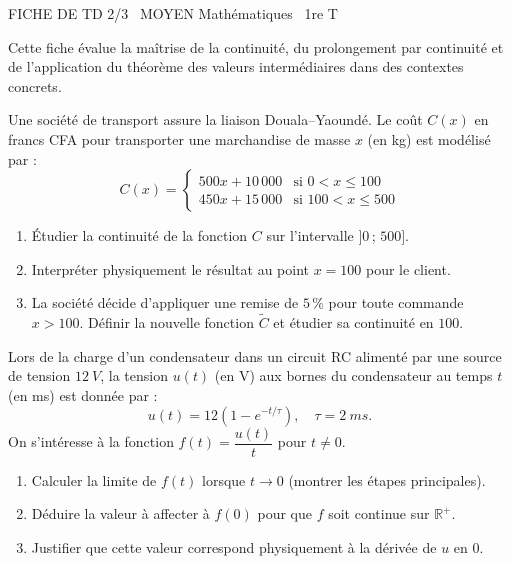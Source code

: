 \documentclass[11pt]{article}
\begin{document}
\begin{tcolorbox}[enhanced,colback=popink,colframe=popink,arc=10pt,boxrule=0pt,left=12pt,right=12pt,top=9pt,bottom=9pt]
{\color{white}\popxbold\small FICHE DE TD 2/3 \textbullet\ MOYEN \hfill Mathématiques \textbullet\ 1re T\par}
\end{tcolorbox}
\vspace{4pt}
Cette fiche évalue la maîtrise de la continuité, du prolongement par continuité et de l'application du théorème des valeurs intermédiaires dans des contextes concrets.

\begin{exercice}
Une société de transport assure la liaison Douala--Yaoundé. Le coût $C(x)$ en francs CFA pour transporter une marchandise de masse $x$ (en kg) est modélisé par :
\[
C(x) = \begin{cases}
500x + 10\,000 & \text{si } 0 < x \le 100 \\[2pt]
450x + 15\,000 & \text{si } 100 < x \le 500
\end{cases}
\]
\begin{enumerate}
\item Étudier la continuité de la fonction $C$ sur l'intervalle $]0\,;\,500]$.
\item Interpréter physiquement le résultat au point $x=100$ pour le client.
\item La société décide d'appliquer une remise de $5\,\%$ pour toute commande $x > 100$. Définir la nouvelle fonction $\widetilde{C}$ et étudier sa continuité en $100$.
\end{enumerate}
\end{exercice}

\begin{exercice}
Lors de la charge d'un condensateur dans un circuit RC alimenté par une source de tension $\SI{12}{V}$, la tension $u(t)$ (en V) aux bornes du condensateur au temps $t$ (en ms) est donnée par :
\[
u(t) = 12\left(1 - e^{-t/\tau}\right), \quad \tau = \SI{2}{ms}.
\]
On s'intéresse à la fonction $f(t) = \dfrac{u(t)}{t}$ pour $t \neq 0$.
\begin{enumerate}
\item Calculer la limite de $f(t)$ lorsque $t \to 0$ (montrer les étapes principales).
\item Déduire la valeur à affecter à $f(0)$ pour que $f$ soit continue sur $\mathbb{R}^+$.
\item Justifier que cette valeur correspond physiquement à la dérivée de $u$ en $0$.
\end{enumerate}
\end{exercice}
\end{document}
